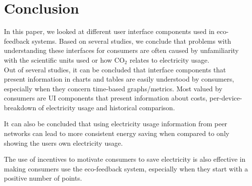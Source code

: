 \documentclass[journal]{vgtc}                %
\begin{document}


\section{Conclusion}
In this paper, we looked at different user interface components used in eco-feedback systems. Based on several studies, we conclude that problems with understanding these interfaces for consumers are often caused by unfamiliarity with the scientific units used or how CO$_2$ relates to electricity usage. \\

Out of several studies, it can be concluded that interface components that present information in charts and tables are easily understood by consumers, especially when they concern time-based graphs/metrics. 
Most valued by consumers are UI components that present information about costs, per-device-breakdown of electricity usage and historical comparison.

It can also be concluded that using electricity usage information from peer networks can lead to more consistent energy saving when compared to only showing the users own electricity usage.

The use of incentives to motivate consumers to save electricity is also effective in making consumers use the eco-feedback system, especially when they start with a positive number of points.





\end{document}
